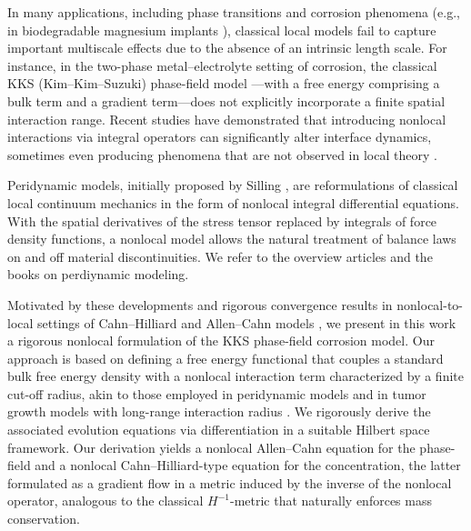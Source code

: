 \documentclass[]{article}
\begin{document}
In many applications, including phase transitions \cite{choksi2009phase} and corrosion phenomena (e.g., in biodegradable magnesium implants \cite{hermann2025nonlocal,mai2016phase}), classical local models fail to capture important multiscale effects due to the absence of an intrinsic length scale. For instance, in the two-phase metal--electrolyte setting of corrosion, the classical KKS (Kim--Kim--Suzuki) phase-field model \cite{kim1999phase}---with a free energy comprising a bulk term and a gradient term---does not explicitly incorporate a finite spatial interaction range. Recent studies have demonstrated that introducing nonlocal interactions via integral operators can significantly alter interface dynamics, sometimes even producing phenomena that are not observed in local theory \cite{burkovska2021nonlocal,ren2021nonlocal,fritz2019local}.

Peridynamic models, initially proposed by Silling \cite{silling2000reformulation}, are reformulations of
classical local continuum mechanics in the form of nonlocal integral differential
equations. With the spatial derivatives of the stress tensor replaced by integrals of
force density functions, a nonlocal model allows the natural treatment of balance
laws on and off material discontinuities. We refer to the overview articles \cite{silling2007peridynamic,silling2010peridynamic} and the books \cite{bobaru2016handbook,madenci2013peridynamic} on perdiynamic modeling.

Motivated by these developments and rigorous convergence results in nonlocal-to-local settings of Cahn--Hilliard and Allen--Cahn models \cite{abels2024strong,davoli2021nonlocal,elbar2023degenerate,trussardi2019nonlocal}, we present in this work a rigorous nonlocal formulation of the KKS phase-field corrosion model. Our approach is based on defining a free energy functional that couples a standard bulk free energy density with a nonlocal interaction term characterized by a finite cut-off radius, akin to those employed in peridynamic models \cite{silling2000reformulation} and in tumor growth models with long-range interaction radius \cite{fritz2023tumor,fritz2019local}. We rigorously derive the associated evolution equations via differentiation in a suitable Hilbert space framework. Our derivation yields a nonlocal Allen--Cahn equation for the phase-field and a nonlocal Cahn--Hilliard-type equation for the concentration, the latter formulated as a gradient flow in a metric induced by the inverse of the nonlocal operator, analogous to the classical \(H^{-1}\)-metric that naturally enforces mass conservation.
\end{document}
